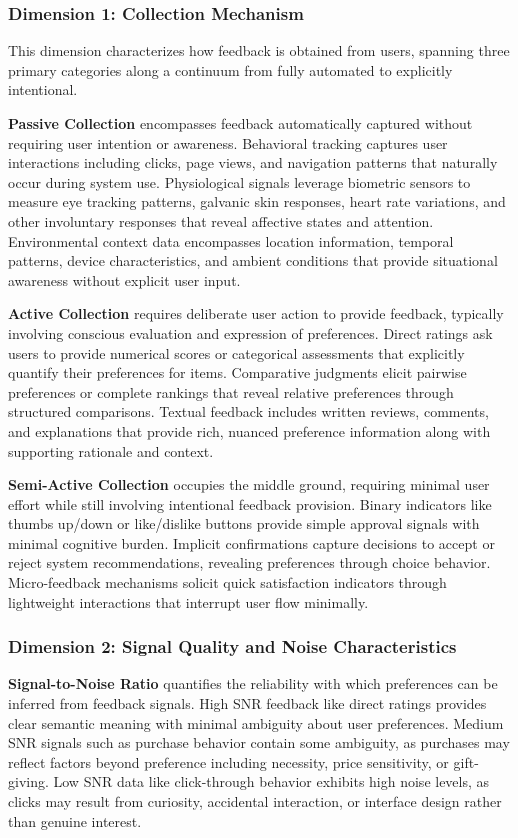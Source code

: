 \subsubsection{Dimension 1: Collection Mechanism}
This dimension characterizes how feedback is obtained from users, spanning three primary categories along a continuum from fully automated to explicitly intentional.

\textbf{Passive Collection} encompasses feedback automatically captured without requiring user intention or awareness. Behavioral tracking captures user interactions including clicks, page views, and navigation patterns that naturally occur during system use. Physiological signals leverage biometric sensors to measure eye tracking patterns, galvanic skin responses, heart rate variations, and other involuntary responses that reveal affective states and attention. Environmental context data encompasses location information, temporal patterns, device characteristics, and ambient conditions that provide situational awareness without explicit user input.

\textbf{Active Collection} requires deliberate user action to provide feedback, typically involving conscious evaluation and expression of preferences. Direct ratings ask users to provide numerical scores or categorical assessments that explicitly quantify their preferences for items. Comparative judgments elicit pairwise preferences or complete rankings that reveal relative preferences through structured comparisons. Textual feedback includes written reviews, comments, and explanations that provide rich, nuanced preference information along with supporting rationale and context.

\textbf{Semi-Active Collection} occupies the middle ground, requiring minimal user effort while still involving intentional feedback provision. Binary indicators like thumbs up/down or like/dislike buttons provide simple approval signals with minimal cognitive burden. Implicit confirmations capture decisions to accept or reject system recommendations, revealing preferences through choice behavior. Micro-feedback mechanisms solicit quick satisfaction indicators through lightweight interactions that interrupt user flow minimally.

\subsubsection{Dimension 2: Signal Quality and Noise Characteristics}

\textbf{Signal-to-Noise Ratio} quantifies the reliability with which preferences can be inferred from feedback signals. High SNR feedback like direct ratings provides clear semantic meaning with minimal ambiguity about user preferences. Medium SNR signals such as purchase behavior contain some ambiguity, as purchases may reflect factors beyond preference including necessity, price sensitivity, or gift-giving. Low SNR data like click-through behavior exhibits high noise levels, as clicks may result from curiosity, accidental interaction, or interface design rather than genuine interest.

